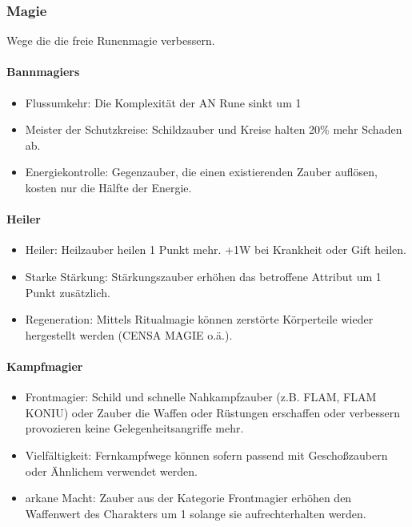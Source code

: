 \documentclass{article}
\begin{document}
\subsubsection{Magie}

Wege die die freie Runenmagie verbessern.

\paragraph{Bannmagiers}

\begin{itemize}
\item Flussumkehr: Die Komplexität der AN Rune sinkt um 1
\item Meister der Schutzkreise: Schildzauber und Kreise halten 20\% mehr Schaden ab.
\item Energiekontrolle: Gegenzauber, die einen existierenden Zauber auflösen, kosten nur die Hälfte der Energie.
\end{itemize}

\paragraph{Heiler}

\begin{itemize}
\item Heiler: Heilzauber heilen 1 Punkt mehr. +1W bei Krankheit oder Gift heilen.
\item Starke Stärkung: Stärkungszauber erhöhen das betroffene Attribut um 1 Punkt zusätzlich.
\item Regeneration: Mittels Ritualmagie können zerstörte Körperteile wieder hergestellt werden (CENSA MAGIE o.ä.).
\end{itemize}

\paragraph{Kampfmagier}

\begin{itemize}
\item Frontmagier: Schild und schnelle Nahkampfzauber (z.B. FLAM, FLAM KONIU) oder Zauber die Waffen oder Rüstungen erschaffen oder verbessern provozieren keine Gelegenheitsangriffe mehr.
\item Vielfältigkeit: Fernkampfwege können sofern passend mit Geschoßzaubern oder Ähnlichem verwendet werden.
\item arkane Macht: Zauber aus der Kategorie Frontmagier erhöhen den Waffenwert des Charakters um 1 solange sie aufrechterhalten werden.
\end{itemize}
\end{document}
